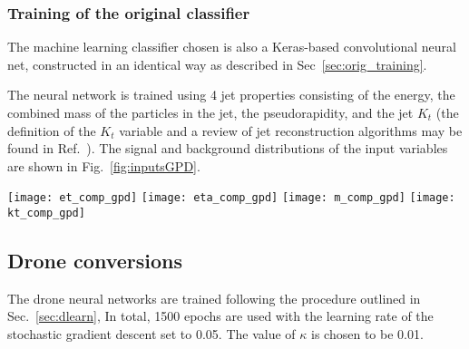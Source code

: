 \subsubsection{Training of the original classifier}

The machine learning classifier chosen is also a Keras-based convolutional neural net,
constructed in an identical way as described in Sec~\ref{sec:orig_training}.

The neural network is trained using 4 jet properties consisting of the energy,
the combined mass of the particles in the jet, the pseudorapidity, and the jet $K_t$ (the definition 
of the $K_t$ variable and a review of jet reconstruction algorithms
may be found in Ref.~\cite{Atkin:2015msa}).
The signal and background distributions of the input variables
are shown in Fig.~\ref{fig:inputsGPD}.
%
\begin{figure*}[t]
\centering
\texttt{[image: et\_comp\_gpd]}
\texttt{[image: eta\_comp\_gpd]}
\texttt{[image: m\_comp\_gpd]}
\texttt{[image: kt\_comp\_gpd]}
\caption{\small Comparison of the signal and background distributions
used to train the Keras classifier .}
\label{fig:inputsGPD}
\end{figure*}

\subsection{Drone conversions}

The drone neural networks are trained following the procedure outlined in Sec.~\ref{sec:dlearn},
In total, 1500 epochs are used with
the learning rate of the stochastic gradient descent set to 0.05.
The value of $\kappa$ is chosen to be 0.01.

